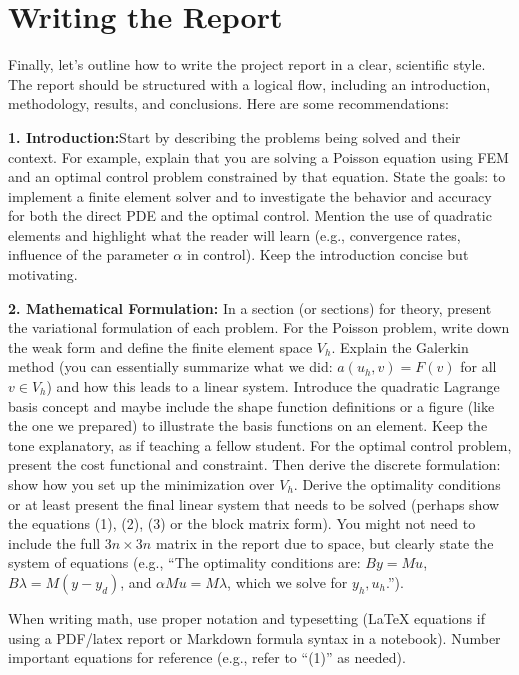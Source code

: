 \documentclass[a4paper,10pt]{report}
\begin{document}
\section{Writing the Report}

Finally, let's outline how to write the project report in a clear, scientific style. The report should be structured with a logical flow, including an introduction, methodology, results, and conclusions. Here are some recommendations:

\textbf{1. Introduction:}Start by describing the problems being solved and their context. For example, explain that you are solving a Poisson equation using FEM and an optimal control problem constrained by that equation. State the goals: to implement a finite element solver and to investigate the behavior and accuracy for both the direct PDE and the optimal control. Mention the use of quadratic elements and highlight what the reader will learn (e.g., convergence rates, influence of the parameter \(\alpha\) in control). Keep the introduction concise but motivating.

\textbf{2. Mathematical Formulation:}
In a section (or sections) for theory, present the variational formulation of each problem. For the Poisson problem, write down the weak form and define the finite element space \(V_h\).
Explain the Galerkin method (you can essentially summarize what we did: \(a(u_h,v)=F(v)\) for all \(v\in V_h\)) and how this leads to a linear system. Introduce the quadratic Lagrange basis concept and maybe include the shape function definitions or a figure (like the one we prepared) to illustrate the basis functions on an element. Keep the tone explanatory, as if teaching a fellow student. For the optimal control problem, present the cost functional and constraint.
Then derive the discrete formulation: show how you set up the minimization over \(V_h\).
Derive the optimality conditions or at least present the final linear system that needs to be solved (perhaps show the equations (1), (2), (3) or the block matrix form). You might not need to include the full \(3n \times 3n\) matrix in the report due to space, but clearly state the system of equations (e.g., “The optimality conditions are: \(B y = M u\), \(B \lambda = M(y - y_d)\), and \(\alpha M u = M \lambda\), which we solve for \(y_h, u_h\).”).

When writing math, use proper notation and typesetting (LaTeX equations if using a PDF/latex report or Markdown formula syntax in a notebook). Number important equations for reference (e.g., refer to “(1)” as needed).
\end{document}
